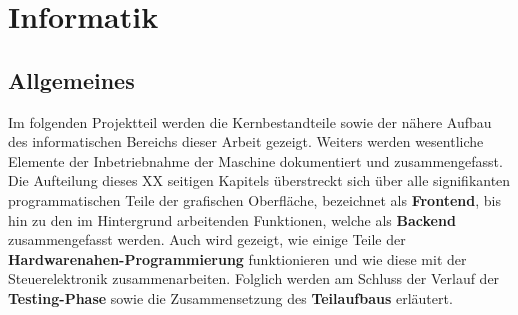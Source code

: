 \chapter{Informatik}\label{ch:informatik}

\section{Allgemeines}\label{sec:einleitung}
Im folgenden Projektteil werden die Kernbestandteile sowie der nähere Aufbau des informatischen Bereichs dieser Arbeit gezeigt.
Weiters werden wesentliche Elemente der Inbetriebnahme der Maschine dokumentiert und zusammengefasst.
Die Aufteilung dieses XX seitigen Kapitels überstreckt sich über alle signifikanten programmatischen Teile der grafischen Oberfläche, bezeichnet als \textbf{Frontend}, bis hin zu den im Hintergrund arbeitenden Funktionen, welche als \textbf{Backend} zusammengefasst werden.
Auch wird gezeigt, wie einige Teile der \textbf{Hardwarenahen-Programmierung} funktionieren und wie diese mit der Steuerelektronik zusammenarbeiten.
Folglich werden am Schluss der Verlauf der \textbf{Testing-Phase} sowie die Zusammensetzung des \textbf{Teilaufbaus} erläutert.

